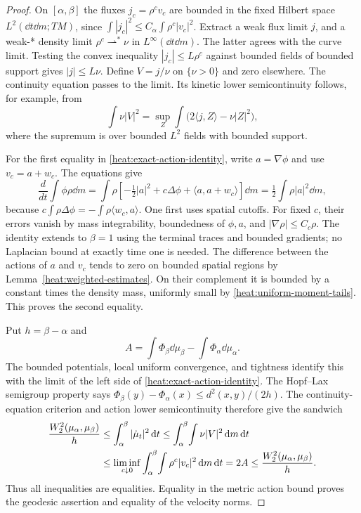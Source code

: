 \begin{proof}
On \([\alpha,\beta]\) the fluxes
\(j_c=\rho^cv_c\) are bounded in the fixed Hilbert space
\(L^2(\dd t\dd m;TM)\), since
\(\int|j_c|^2\le C_\alpha\int\rho^c|v_c|^2\).
Extract a weak flux limit \(j\), and a weak-* density limit
\(\rho^c\rightharpoonup^*\nu\) in \(L^\infty(\dd t\dd m)\).
The latter agrees with the curve limit. Testing the convex
inequality \(|j_c|\le L\rho^c\) against bounded fields of
bounded support gives \(|j|\le L\nu\). Define
\(V=j/\nu\) on \(\{\nu>0\}\) and zero elsewhere. The
continuity equation passes to the limit. Its kinetic lower
semicontinuity follows, for example, from
\[
\int\nu|V|^2
=\sup_Z\int\bigl(2\langle j,Z\rangle-\nu|Z|^2\bigr),
\]
where the supremum is over bounded \(L^2\) fields with
bounded support.

For the first equality in
\eqref{heat:exact-action-identity}, write
\(a=\nabla\phi\) and use \(v_c=a+w_c\). The equations give
\[
\frac d{dt}\int\phi\rho\dd m
=\int\rho\left[-\tfrac12|a|^2+c\Delta\phi
+\langle a,a+w_c\rangle\right]\dd m
=\tfrac12\int\rho|a|^2\dd m,
\]
because
\(c\int\rho\Delta\phi=-\int\rho\langle w_c,a\rangle\).
One first uses spatial cutoffs. For fixed \(c\), their errors
vanish by mass integrability, boundedness of \(\phi,a\), and
\(|\nabla\rho|\le C_c\rho\). The identity extends to
\(\beta=1\) using the terminal traces and bounded gradients;
no Laplacian bound at exactly time one is needed. The
difference between the actions of \(a\) and \(v_c\) tends to
zero on bounded spatial regions by
Lemma~\ref{heat:weighted-estimates}. On their complement it
is bounded by a constant times the density mass, uniformly
small by \eqref{heat:uniform-moment-tails}. This proves the
second equality.

Put \(h=\beta-\alpha\) and
\[
A=\int\Phi_\beta\dd\mu_\beta-
\int\Phi_\alpha\dd\mu_\alpha.
\]
The bounded potentials, local uniform convergence, and
tightness identify this with the limit of the left side of
\eqref{heat:exact-action-identity}. The Hopf--Lax semigroup
property says
\(\Phi_\beta(y)-\Phi_\alpha(x)\le d^2(x,y)/(2h)\).
The continuity-equation criterion and action lower
semicontinuity therefore give the sandwich
\begin{align}
\label{heat:action-sandwich}
\frac{W_2^2(\mu_\alpha,\mu_\beta)}{h}
&\le\int_\alpha^\beta|\dot\mu_t|^2\,\mathrm d t
\le\int_\alpha^\beta\!\int\nu|V|^2\,\mathrm d m\,\mathrm d t\notag\\
&\le\liminf_{c\downarrow0}
\int_\alpha^\beta\!\int\rho^c|v_c|^2\,\mathrm d m\,\mathrm d t
=2A\le\frac{W_2^2(\mu_\alpha,\mu_\beta)}{h}.
\end{align}
Thus all inequalities are equalities. Equality in the
metric action bound proves the geodesic assertion and
equality of the velocity norms.


\end{proof}
